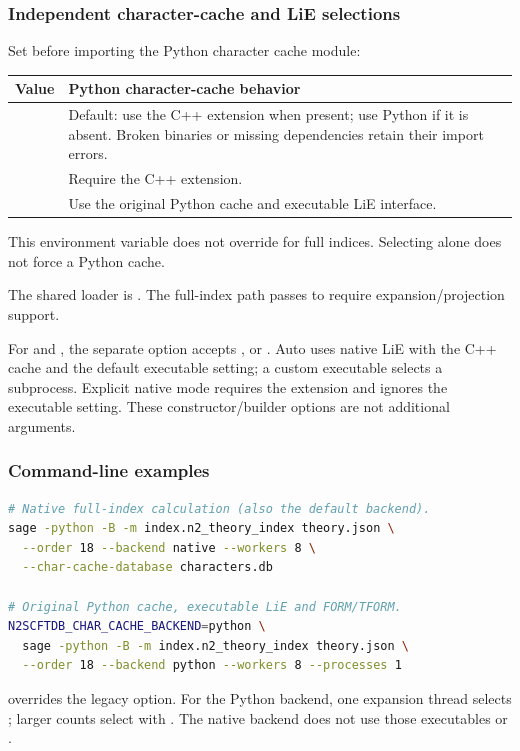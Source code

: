\subsubsection{Independent character-cache and LiE selections}
Set  before importing the Python character
cache module:
\begin{tabularx}{\textwidth}{@{}p{28mm}Y@{}}
\toprule Value & Python character-cache behavior\\\midrule
{} & Default: use the C++ extension when present; use Python if it is
absent. Broken binaries or missing dependencies retain their import errors.\\
 & Require the C++ extension.\\
 & Use the original Python cache and executable LiE interface.\\\bottomrule
\end{tabularx}
This environment variable does not override  for full
indices. Selecting  alone does not force a Python cache.

The shared loader is .
The full-index path passes
 to require expansion/projection support.

For  and ,
the separate  option accepts ,
 or . Auto uses native LiE with the C++
cache and the default executable setting; a custom executable selects a
subprocess. Explicit native mode requires the extension and ignores the
executable setting. These constructor/builder options are not additional
 arguments.

\subsubsection{Command-line examples}
\begin{lstlisting}[language=bash]
# Native full-index calculation (also the default backend).
sage -python -B -m index.n2_theory_index theory.json \
  --order 18 --backend native --workers 8 \
  --char-cache-database characters.db

# Original Python cache, executable LiE and FORM/TFORM.
N2SCFTDB_CHAR_CACHE_BACKEND=python \
  sage -python -B -m index.n2_theory_index theory.json \
  --order 18 --backend python --workers 8 --processes 1
\end{lstlisting}
\code{--workers} overrides the legacy  option. For the
Python backend, one expansion thread selects ; larger
counts select \code{--tform-executable} with \code{-wN}. The native backend
does not use those executables or .

